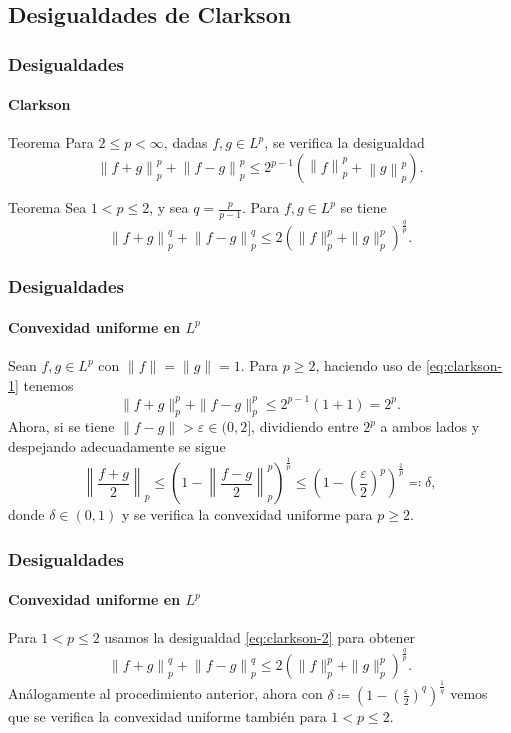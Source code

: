 \documentclass[aspectratio=169]{beamer}
\begin{document}
\subsection{Desigualdades de Clarkson}
\begin{frame}
  \frametitle{Desigualdades}
  \framesubtitle{Clarkson}
  \begin{block}{Teorema}
    Para $ 2 \leq p < \infty $, dadas $ f, g \in L^p $, se verifica la desigualdad
    \begin{equation} \label{eq:clarkson-1}
        \left\| f+g \right\|_p^p + \left\| f-g \right\|_p^p \leq 2^{p-1} \left( \left\|f\right\|_p^p + \left\|g\right\|_p^p \right).
    \end{equation}
  \end{block}
  \begin{block}{Teorema}
    Sea $ 1 < p \leq 2 $, y sea $ q = \frac{p}{p-1}$. Para $ f, g \in L^p $ se tiene
    \begin{equation} \label{eq:clarkson-2}
        \left\| f + g \right\|_p^q + \left\| f - g \right\|_p^q \leq 2 \left(\|f \|_p^p + \|g\|_p^p \right)^{\frac{q}{p}}.
    \end{equation}
  \end{block}
\end{frame}

\begin{frame}
  \frametitle{Desigualdades}
  \framesubtitle{Convexidad uniforme en $L^p$}
  Sean $ f, g \in L^p $ con $ \|f\| = \|g\| = 1 $. Para $ p \geq 2 $, haciendo uso de \eqref{eq:clarkson-1} tenemos
    \begin{equation}
        \| f + g \|_p^p + \| f - g \|_p^p \leq 2^{p-1}(1 + 1) = 2^p.
    \end{equation}
    Ahora, si se tiene $\|f-g\| > \varepsilon \in (0, 2] $, dividiendo entre $ 2^p $ a ambos lados y despejando adecuadamente se sigue
    \begin{equation}
        \left\| \frac{f + g}{2} \right\|_p \leq \left( 1 - \left\| \frac{f - g}{2} \right\|_p^p\right)^{\frac{1}{p}} \leq \left( 1 - \left( \frac{\varepsilon}{2} \right)^p\right)^{\frac{1}{p}} \eqcolon \delta,
    \end{equation}
    donde $ \delta \in (0, 1) $ y se verifica la convexidad uniforme para $ p \geq 2 $. 
\end{frame}

\begin{frame}
  \frametitle{Desigualdades}
  \framesubtitle{Convexidad uniforme en $L^p$}
  Para $ 1 < p \leq 2 $ usamos la desigualdad \eqref{eq:clarkson-2} para obtener
    \begin{equation}
        \left\| f + g \right\|_p^q + \left\| f - g \right\|_p^q \leq 2 \left(\|f \|_p^p + \|g\|_p^p \right)^{\frac{q}{p}}.
    \end{equation}
    Análogamente al procedimiento anterior, ahora con $ \delta \coloneq  \left( 1 - \left( \frac{\varepsilon}{2} \right)^q\right)^{\frac{1}{q}} $ vemos que se verifica la convexidad uniforme también para $ 1 < p \leq 2 $.
\end{frame}
\end{document}
